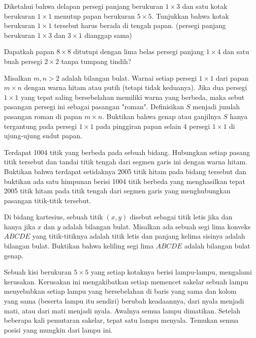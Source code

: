 \documentclass[12pt]{scrartcl}
\begin{document}
\begin{soaljawab}
    Diketahui bahwa delapan persegi panjang berukuran $1 \times 3$ dan satu kotak berukuran $1 \times 1$ menutup papan berukuran $5 \times 5$. Tunjukkan bahwa kotak berukuran $1 \times 1$ tersebut harus berada di tengah papan. (persegi panjang berukuran $1 \times 3$ dan $3 \times 1$ dianggap sama)
\end{soaljawab}

\begin{soaljawab}
    Dapatkah papan $8\times8$ ditutupi dengan lima belas persegi panjang $1\times4$ dan satu buah persegi $2\times2$ tanpa tumpang tindih?
\end{soaljawab}

\begin{soaljawab}
    Misalkan $m,n > 2$ adalah bilangan bulat. Warnai setiap persegi $1\times1$ dari papan $m\times n$ dengan warna hitam atau putih (tetapi tidak keduanya). Jika dua persegi $1\times1$ yang tepat saling bersebelahan memiliki warna yang berbeda, maka sebut pasangan persegi ini sebagai pasangan "roman". Definisikan $S$ menjadi jumlah pasangan roman di papan $m\times n$. Buktikan bahwa genap atau ganjilnya $S$ hanya tergantung pada persegi $1\times1$ pada pinggiran papan selain 4 persegi $1\times1$ di ujung-ujung sudut papan.
\end{soaljawab}

\begin{soaljawab}
    Terdapat 1004 titik yang berbeda pada sebuah bidang. Hubungkan setiap pasang titik tersebut dan tandai titik tengah dari segmen garis ini dengan warna hitam. Buktikan bahwa terdapat setidaknya 2005 titik hitam pada bidang tersebut dan buktikan ada satu himpunan berisi 1004 titik berbeda yang menghasilkan tepat 2005 titik hitam pada titik tengah dari segmen garis yang menghubungkan pasangan titik-titik tersebut.
\end{soaljawab}

\begin{soaljawab}
    Di bidang kartesius, sebuah titik $(x,y)$ disebut sebagai titik letis jika dan
hanya jika $x$ dan $y$ adalah bilangan bulat. Misalkan ada sebuah segi lima konveks $ABCDE$
yang titik-titiknya adalah titik letis dan panjang kelima sisinya adalah bilangan bulat.
Buktikan bahwa keliling segi lima $ABCDE$ adalah bilangan bulat genap.
\end{soaljawab}

\begin{soaljawab}
    Sebuah kisi berukuran $5 \times 5$ yang setiap kotaknya berisi lampu-lampu, mengalami kerusakan. Kerusakan ini mengakibatkan setiap memencet sakelar sebuah lampu menyebabkan setiap lampu yang bersebelahan di baris yang sama dan kolom yang sama (beserta lampu itu sendiri) berubah keadaannya, dari nyala menjadi mati, atau dari mati menjadi nyala. Awalnya semua lampu dimatikan. Setelah beberapa kali pemutaran sakelar, tepat satu lampu menyala. Temukan semua posisi yang mungkin dari lampu ini.
\end{soaljawab}
\end{document}
